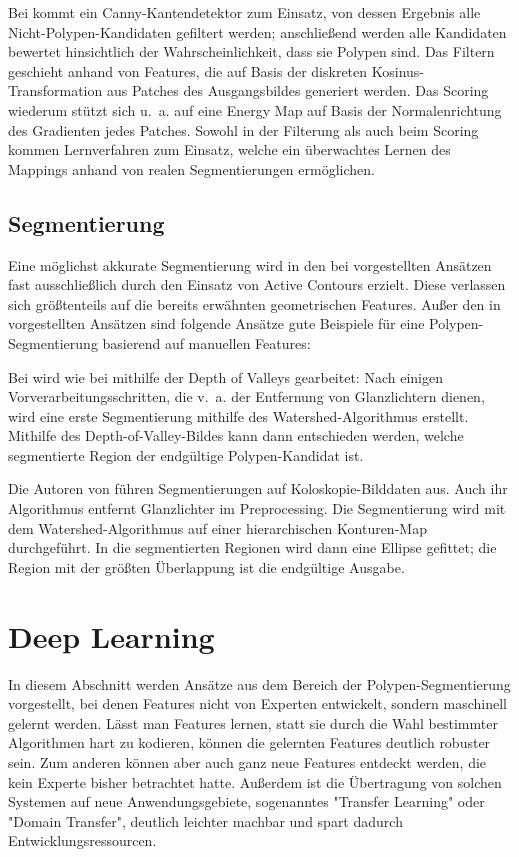 Bei \cite{Tajbakhsh.2016b} kommt ein Canny-Kantendetektor zum Einsatz, von dessen Ergebnis alle Nicht-Polypen-Kandidaten gefiltert werden; anschließend werden alle Kandidaten bewertet hinsichtlich der Wahrscheinlichkeit, dass sie Polypen sind.
Das Filtern geschieht anhand von Features, die auf Basis der diskreten Kosinus-Transformation aus Patches des Ausgangsbildes generiert werden.
Das Scoring wiederum stützt sich u.~a. auf eine Energy Map auf Basis der Normalenrichtung des Gradienten jedes Patches.
Sowohl in der Filterung als auch beim Scoring kommen Lernverfahren zum Einsatz, welche ein überwachtes Lernen des Mappings anhand von realen Segmentierungen ermöglichen.

\subsection{Segmentierung}

Eine möglichst akkurate Segmentierung wird in den bei \cite{Prasath.2016} vorgestellten Ansätzen fast ausschließlich durch den Einsatz von Active Contours erzielt.
Diese verlassen sich größtenteils auf die bereits erwähnten geometrischen Features.
Außer den in \cite{Prasath.2016} vorgestellten Ansätzen sind folgende Ansätze gute Beispiele für eine Polypen-Segmentierung basierend auf manuellen Features:

Bei \cite{Bernal.2012} wird wie bei \cite{Bernal.2015} mithilfe der Depth of Valleys gearbeitet:
Nach einigen Vorverarbeitungsschritten, die v.~a. der Entfernung von Glanzlichtern dienen, wird eine erste Segmentierung mithilfe des Watershed-Algorithmus erstellt.
Mithilfe des Depth-of-Valley-Bildes kann dann entschieden werden, welche segmentierte Region der endgültige Polypen-Kandidat ist.

Die Autoren von \cite{Ganz.2012} führen Segmentierungen auf Koloskopie-Bilddaten aus.
Auch ihr Algorithmus entfernt Glanzlichter im Preprocessing.
Die Segmentierung wird mit dem Watershed-Algorithmus auf einer hierarchischen Konturen-Map durchgeführt.
In die segmentierten Regionen wird dann eine Ellipse gefittet; die Region mit der größten Überlappung ist die endgültige Ausgabe.



\section{Deep Learning}\label{sec:deep-learning}

In diesem Abschnitt werden Ansätze aus dem Bereich der Polypen-Segmentierung vorgestellt, bei denen Features nicht von Experten entwickelt, sondern maschinell gelernt werden.
Lässt man Features lernen, statt sie durch die Wahl bestimmter Algorithmen hart zu kodieren, können die gelernten Features deutlich robuster sein.
Zum anderen können aber auch ganz neue Features entdeckt werden, die kein Experte bisher betrachtet hatte.
Außerdem ist die Übertragung von solchen Systemen auf neue Anwendungsgebiete, sogenanntes "Transfer Learning" oder "Domain Transfer", deutlich leichter machbar und spart dadurch Entwicklungsressourcen.


